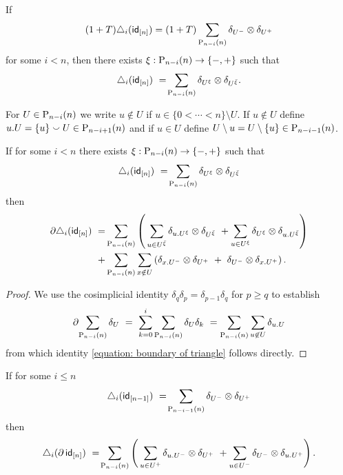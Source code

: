 \begin{lemma} \label{lemma: (1+T) triangle = (1+T) sum implies triangle = sum}
    If
    \[
    (1 + T) \triangle_i (\id_{[n]}) =
    (1 + T) \sum_{\P_{n-i}(n)} \delta_{U^-} \otimes \delta_{U^+}
    \]
    for some $i < n$, then there exists $\xi : \P_{n-i}(n) \to \{-, +\}$  such that
    \[
    \triangle_i (\id_{[n]})\ =\! \sum_{\P_{n-i}(n)} \delta_{U^{\xi}} \otimes \delta_{U^{\bar{\xi}}}.
    \]
\end{lemma}

\begin{notation}
    For $U \in \P_{n-i}(n)$ we write $u \notin U$ if $u \in \{0 < \cdots< n\} \setminus U$. If $u \notin U$ define $u.U = \{u\} \union U \in \P_{n-i+1}(n)$ and if $u \in U$ define $U \setminus u = U \setminus \{u\} \in \P_{n-i-1}(n)$.
\end{notation}

\begin{lemma} \label{lemma: boundary of triangle}
	If for some $i < n$ there exists $\xi : \P_{n-i}(n) \to \{-, +\}$ such that
	\[
	\triangle_i(\id_{[n]})\ =\! \sum_{\P_{n-i}(n)} \delta_{U^{\xi}} \otimes \delta_{U^{{\bar{\xi}}}}
	\]
	then
	\begin{align}
	\label{equation: boundary of triangle}
	\partial \triangle_i(\id_{[n]})\ = &
	\sum_{\P_{n-i}(n)} \left( \, \sum_{u \in U^{\bar{\xi}}} \delta_{u.U^\xi} \tensor \delta_{U^{\bar{\xi}}} \ +
	\sum_{u \in U^\xi} \delta_{U^\xi} \tensor \delta_{u.U^{\bar{\xi}}} \right) \\ + &
	\sum_{\P_{n-i}(n)} \sum_{x \notin U} \left( \delta_{x.U^-} \tensor \delta_{U^+}\ +\ \delta_{U^-} \tensor \delta_{x.U^+} \right).
	\end{align}
\end{lemma}

\begin{proof}
	We use the cosimplicial identity $\delta_q \delta_p = \delta_{p-1} \delta_q$ for $p \geq q$ to establish
	\begin{equation} \label{equation: partial of d over P}
	\partial \! \sum_{\P_{n-i}(n)} \delta_{U}\ =\ \sum_{k = 0}^{i} \sum_{\P_{n-i}(n)} \delta_{U} \delta_k \ = \sum_{\P_{n-i}(n)} \sum_{u \not\in U} \delta_{u.U}
	\end{equation}
	from which identity \eqref{equation: boundary of triangle} follows directly.
\end{proof}

\begin{lemma} \label{lemma: boundary of triangle}
	If for some $i \leq n$
	\[
	\triangle_i(\id_{[n-1]})\ =\! \sum_{\P_{n-i-1}(n)} \delta_{U^-} \otimes \delta_{U^+}
	\]
	then
	\begin{align}
	\label{equation: triangle of boundary}
	\triangle_i (\partial \, \id_{[n]}) \ =\! \sum_{\P_{n-i}(n)} \left( \,
	\sum_{u \in U^+} \delta_{u.U^-} \tensor \delta_{U^+} \ +
	\sum_{u \in U^-} \delta_{U^-} \tensor \delta_{u.U^+} \right).
	\end{align}
\end{lemma}

